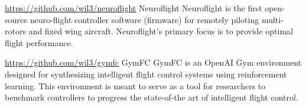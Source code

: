 

\begin{cventries}
  \cvproject
    {\href{https://github.com/wil3/neuroflight}{https://github.com/wil3/neuroflight}} %
    {Neuroflight} %
    {} %
    {} %
    {
Neuroflight is the first open-source neuro-flight controller software (firmware) for remotely piloting multi-rotors and fixed wing aircraft. Neuroflight's primary focus is to provide optimal flight performance.
    }


  \cvproject
    {\href{https://github.com/wil3/gymfc}{https://github.com/wil3/gymfc}} %
    {GymFC} %
    {} %
    {} %
    {
GymFC is an OpenAI Gym environment designed for synthesizing intelligent flight control systems using reinforcement learning. This environment is meant to serve as a tool for researchers to benchmark controllers to progress the state-of-the art of intelligent flight control.
    }

\end{cventries}
